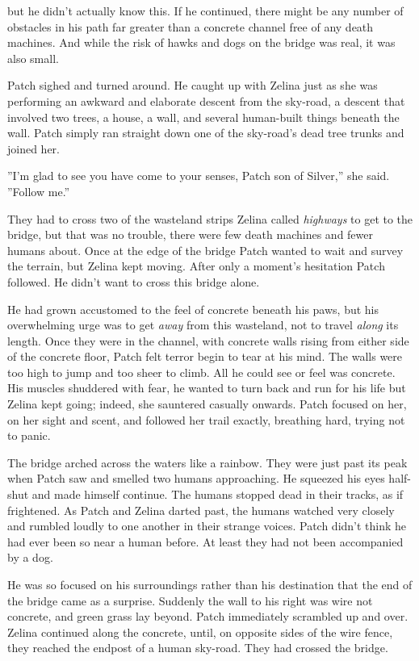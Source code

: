 \documentclass[11pt]{article}
\begin{document}
 but he didn't actually know this. If he continued, there might be any number of obstacles in his path far greater than a concrete channel free of any death machines. And while the risk of hawks and dogs on the bridge was real, it was also small.\par
 Patch sighed and turned around. He caught up with Zelina just as she was performing an awkward and elaborate descent from the sky-road, a descent that involved two trees, a house, a wall, and several human-built things beneath the wall. Patch simply ran straight down one of the sky-road's dead tree trunks and joined her.\par
 ''I'm glad to see you have come to your senses, Patch son of Silver,'' she said. ''Follow me.''\par
 They had to cross two of the wasteland strips Zelina called {\it highways} to get to the bridge, but that was no trouble, there were few death machines and fewer humans about. Once at the edge of the bridge Patch wanted to wait and survey the terrain, but Zelina kept moving. After only a moment's hesitation Patch followed. He didn't want to cross this bridge alone.\par
 He had grown accustomed to the feel of concrete beneath his paws, but his overwhelming urge was to get {\it away} from this wasteland, not to travel {\it along} its length. Once they were in the channel, with concrete walls rising from either side of the concrete floor, Patch felt terror begin to tear at his mind. The walls were too high to jump and too sheer to climb. All he could see or feel was concrete. His muscles shuddered with fear, he wanted to turn back and run for his life %
 but Zelina kept going; indeed, she sauntered casually onwards. Patch focused on her, on her sight and scent, and followed her trail exactly, breathing hard, trying not to panic.\par
 The bridge arched across the waters like a rainbow. They were just past its peak when Patch saw and smelled two humans approaching. He squeezed his eyes half-shut and made himself continue. The humans stopped dead in their tracks, as if frightened. As Patch and Zelina darted past, the humans watched very closely and rumbled loudly to one another in their strange voices. Patch didn't think he had ever been so near a human before. At least they had not been accompanied by a dog.\par
 He was so focused on his surroundings rather than his destination that the end of the bridge came as a surprise. Suddenly the wall to his right was wire not concrete, and green grass lay beyond. Patch immediately scrambled up and over. Zelina continued along the concrete, until, on opposite sides of the wire fence, they reached the endpost of a human sky-road. They had crossed the bridge.\par
\end{document}
